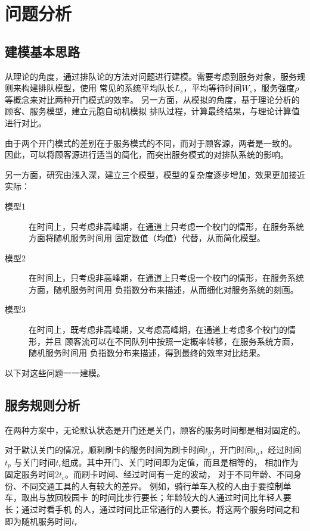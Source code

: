 \section{问题分析}
\subsection{建模基本思路}
从理论的角度，通过排队论的方法对问题进行建模。需要考虑到服务对象，服务规则来构建排队模型，使用
常见的系统平均队长$ L_s$，平均等待时间$W_s$，服务强度$\rho$等概念来对比两种开门模式的效率。
另一方面，从模拟的角度，基于理论分析的顾客、服务模型，建立元胞自动机模拟
排队过程，计算最终结果，与理论计算值进行对比。
\par 由于两个开门模式的差别在于服务模式的不同，而对于顾客源，两者是一致的。
因此，可以将顾客源进行适当的简化，而突出服务模式的对排队系统的影响。
\par 另一方面，研究由浅入深，建立三个模型，模型的复杂度逐步增加，效果更加接近实际：
\begin{description}
    \item[模型1] 在时间上，只考虑非高峰期，在通道上只考虑一个校门的情形，在服务系统方面将随机服务时间用
    固定数值（均值）代替，从而简化模型。
    \item[模型2] 在时间上，只考虑非高峰期，在通道上只考虑一个校门的情形，在服务系统方面，随机服务时间用
    负指数分布来描述，从而细化对服务系统的刻画。
    \item[模型3] 在时间上，既考虑非高峰期，又考虑高峰期，在通道上考虑多个校门的情形，并且
    顾客流可以在不同队列中按照一定概率转移，在服务系统方面，随机服务时间用
    负指数分布来描述，得到最终的效率对比结果。
\end{description}
以下对这些问题一一建模。

\subsection{服务规则分析}
	在两种方案中，无论默认状态是开门还是关门，顾客的服务时间都是相对固定的。

    对于默认关门的情况，顺利刷卡的服务时间为刷卡时间$t_{g}$，开门时间$t_{o}$，经过时间$t_{p}$
    与关门时间$t_{c}$组成。其中开门、关门时间即为定值，而且是相等的，
    相加作为固定服务时间$2t_{c}$。而刷卡时间、经过时间有一定的波动，
    对于不同年龄、不同身份、不同交通工具的人有较大的差异。
    例如，骑行单车入校的人由于要控制单车，取出与放回校园卡
    的时间比步行要长；年龄较大的人通过时间比年轻人要长；通过时看手机
    的人，通过时间比正常通行的人要长。将这两个服务时间之和即为随机服务时间$t_{r}$
    
